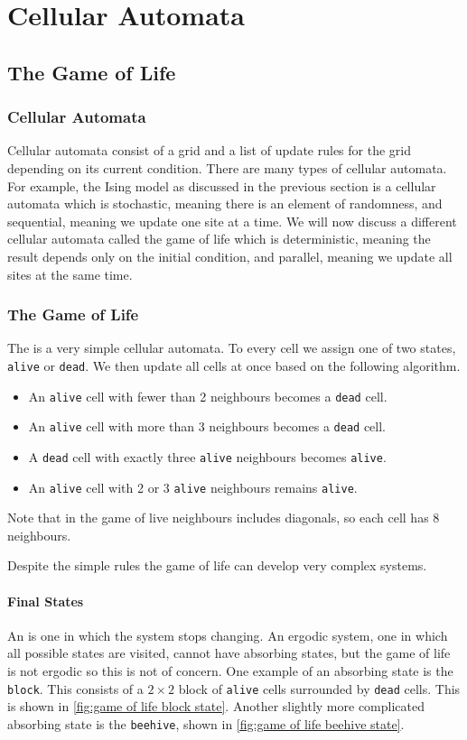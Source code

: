 \documentclass[fleqn]{NotesClass}
\begin{document}
    \part{Cellular Automata}
    \chapter{The Game of Life}
    \section{Cellular Automata}
    Cellular automata consist of a grid and a list of update rules for the grid depending on its current condition.
    There are many types of cellular automata.
    For example, the Ising model as discussed in the previous section is a cellular automata which is stochastic, meaning there is an element of randomness, and sequential, meaning we update one site at a time.
    We will now discuss a different cellular automata called the game of life which is deterministic, meaning the result depends only on the initial condition, and parallel, meaning we update all sites at the same time.
    
    \section{The Game of Life}
    The  is a very simple cellular automata.
    To every cell we assign one of two states, \texttt{alive} or \texttt{dead}.
    We then update all cells at once based on the following algorithm.
    \begin{itemize}
        \item An \texttt{alive} cell with fewer than 2 neighbours becomes a \texttt{dead} cell.
        \item An \texttt{alive} cell with more than 3 neighbours becomes a \texttt{dead} cell.
        \item A \texttt{dead} cell with exactly three \texttt{alive} neighbours becomes \texttt{alive}.
        \item An \texttt{alive} cell with 2 or 3 \texttt{alive} neighbours remains \texttt{alive}.
    \end{itemize}
    Note that in the game of live neighbours includes diagonals, so each cell has 8 neighbours.
    
    Despite the simple rules the game of life can develop very complex systems.
    
    \subsection{Final States}
    An  is one in which the system stops changing.
    An ergodic system, one in which all possible states are visited, cannot have absorbing states, but the game of life is not ergodic so this is not of concern.
    One example of an absorbing state is the \texttt{block}.
    This consists of a \(2\times 2\) block of \texttt{alive} cells surrounded by \texttt{dead} cells.
    This is shown in \cref{fig:game of life block state}.
    Another slightly more complicated absorbing state is the \texttt{beehive}, shown in \cref{fig:game of life beehive state}.
    
\end{document}
